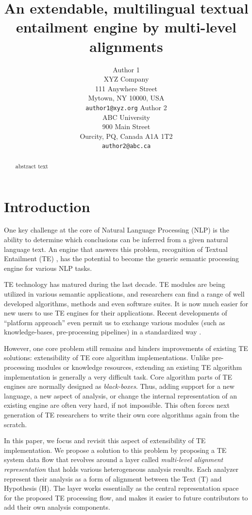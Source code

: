\documentclass[11pt,letterpaper]{article}
\title{An extendable, multilingual textual entailment engine by
  multi-level alignments}
\author{Author 1\\
	    XYZ Company\\
	    111 Anywhere Street\\
	    Mytown, NY 10000, USA\\
	    {\tt author1@xyz.org}
	  \And
	Author 2\\
  	ABC University\\
  	900 Main Street\\
  	Ourcity, PQ, Canada A1A 1T2\\
  {\tt author2@abc.ca}}
\date{}
\begin{document}
\maketitle
\begin{abstract}
 abstract text 
\end{abstract}

\section{Introduction}
One key challenge at the core of Natural Language Processing (NLP) is
the ability to determine which conclusions can be inferred from a
given natural language text. An engine that answers this problem,
recognition of Textual Entailment (TE) \cite{}, has the potential to
become the generic semantic processing engine for various NLP tasks.     

TE technology has matured during the last decade. TE modules are being 
utilized in various semantic applications, and researchers can
find a range of well developed algorithms, methods and even software
suites. It is now much easier for new users to use TE engines for
their applications. Recent developments of ``platform approach'' even
permit us to exchange various modules (such as knowledge-bases,
pre-processing pipelines) in a standardized way \cite{}.     

However, one core problem still remains and hinders improvements of  
existing TE solutions: extensibility of TE core algorithm
implementations. Unlike pre-processing modules or knowledge resources,   
extending an existing TE algorithm implementation is generally a very
difficult task. Core algorithm parts of TE engines are normally
designed as {\em black-boxes}. Thus, adding support for a new
language, a new aspect of analysis, or change the internal
representation of an existing engine are often very hard, if not
impossible. This often forces next generation of TE researchers to
write their own core algorithms again from the scratch.

In this paper, we focus and revisit this aspect of extensibility of TE
implementation. We propose a solution to this problem by proposing a 
TE system data flow that revolves around a layer called {\em
  multi-level alignment representation} that holds various
heterogeneous analysis results. Each analyzer represent their analysis
as a form of alignment between the Text (T) and Hypothesis (H). The
layer works essentially as the central representation space for the
proposed TE processing flow, and makes it easier to future contributors
to add their own analysis components. 
\end{document}
